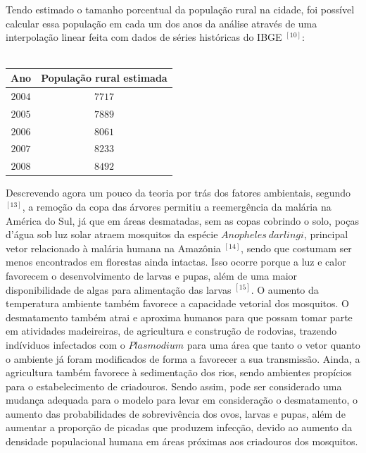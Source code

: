 \documentclass[12pt]{article}
\begin{document}
\\\\
Tendo estimado o tamanho porcentual da população rural na cidade, foi possível calcular essa população em cada um dos anos da análise através de uma interpolação linear feita com dados de séries históricas do IBGE $^{[10]}$:
\\\\
\begin{adjustwidth}{-1cm}{}
\begin{center}
\renewcommand{\arraystretch}{1.5}
\begin{tabular}{|c | c|} 
 \hline
 \textbf{Ano} & \textbf{População rural estimada}\\ 
 \hline
$2004$ & $7717$ \\
 \hline
 $2005$ & $7889$ \\
 \hline
 $2006$ & $8061$ \\
 \hline
 $2007$ & $8233$ \\
 \hline
 $2008$ & $8492$ \\
 \hline
\end{tabular}
\end{center}
\end{adjustwidth}

\vspace{1cm}
Descrevendo agora um pouco da teoria por trás dos fatores ambientais, segundo $^{[13]}$, a remoção da copa das árvores permitiu a reemergência da malária na América do Sul, já que em áreas desmatadas, sem as copas cobrindo o solo, poças d'água sob luz solar atraem mosquitos da espécie $Anopheles \ darlingi$, principal vetor relacionado à malária humana na Amazônia $^{[14]}$, sendo que costumam ser menos encontrados em florestas ainda intactas. Isso ocorre porque a luz e calor favorecem o desenvolvimento de larvas e pupas, além de uma maior disponibilidade de algas para alimentação das larvas $^{[15]}$. O aumento da temperatura ambiente também favorece a capacidade vetorial dos mosquitos. O desmatamento também atrai e aproxima humanos para que possam tomar parte em atividades madeireiras, de agricultura e construção de rodovias, trazendo indíviduos infectados com o $Plasmodium$ para uma área que tanto o vetor quanto o ambiente já foram modificados de forma a favorecer a sua transmissão. Ainda, a agricultura também favorece à sedimentação dos rios, sendo ambientes propícios para o estabelecimento de criadouros. Sendo assim, pode ser considerado uma mudança adequada para o modelo para levar em consideração o desmatamento, o aumento das probabilidades de sobrevivência dos ovos, larvas e pupas, além de aumentar a proporção de picadas que produzem infecção, devido ao aumento da densidade populacional humana em áreas próximas aos criadouros dos mosquitos.
\newpage
\end{document}
